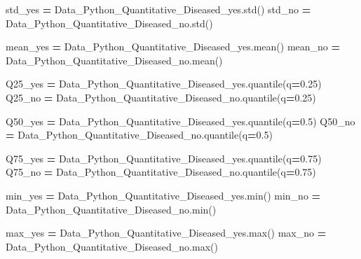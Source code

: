 \documentclass[
  11pt,
  a4paper,
]{article}
\newenvironment{Shaded}{\begin{snugshade}}{\end{snugshade}}
\newcommand{\BuiltInTok}[1]{#1}
\newcommand{\FloatTok}[1]{\textcolor[rgb]{0.00,0.00,0.81}{#1}}
\newcommand{\NormalTok}[1]{#1}
\newcommand{\OperatorTok}[1]{\textcolor[rgb]{0.81,0.36,0.00}{\textbf{#1}}}
\begin{document}
\begin{Shaded}
\begin{Highlighting}[]
\NormalTok{std\_yes }\OperatorTok{=}\NormalTok{ Data\_Python\_Quantitative\_Diseased\_yes.std()}
\NormalTok{std\_no }\OperatorTok{=}\NormalTok{ Data\_Python\_Quantitative\_Diseased\_no.std()}

\NormalTok{mean\_yes }\OperatorTok{=}\NormalTok{ Data\_Python\_Quantitative\_Diseased\_yes.mean()}
\NormalTok{mean\_no }\OperatorTok{=}\NormalTok{ Data\_Python\_Quantitative\_Diseased\_no.mean()}

\NormalTok{Q25\_yes }\OperatorTok{=}\NormalTok{ Data\_Python\_Quantitative\_Diseased\_yes.quantile(q}\OperatorTok{=}\FloatTok{0.25}\NormalTok{)}
\NormalTok{Q25\_no }\OperatorTok{=}\NormalTok{ Data\_Python\_Quantitative\_Diseased\_no.quantile(q}\OperatorTok{=}\FloatTok{0.25}\NormalTok{)}

\NormalTok{Q50\_yes }\OperatorTok{=}\NormalTok{ Data\_Python\_Quantitative\_Diseased\_yes.quantile(q}\OperatorTok{=}\FloatTok{0.5}\NormalTok{)}
\NormalTok{Q50\_no }\OperatorTok{=}\NormalTok{ Data\_Python\_Quantitative\_Diseased\_no.quantile(q}\OperatorTok{=}\FloatTok{0.5}\NormalTok{)}

\NormalTok{Q75\_yes }\OperatorTok{=}\NormalTok{ Data\_Python\_Quantitative\_Diseased\_yes.quantile(q}\OperatorTok{=}\FloatTok{0.75}\NormalTok{)}
\NormalTok{Q75\_no }\OperatorTok{=}\NormalTok{ Data\_Python\_Quantitative\_Diseased\_no.quantile(q}\OperatorTok{=}\FloatTok{0.75}\NormalTok{)}

\NormalTok{min\_yes }\OperatorTok{=}\NormalTok{ Data\_Python\_Quantitative\_Diseased\_yes.}\BuiltInTok{min}\NormalTok{()}
\NormalTok{min\_no }\OperatorTok{=}\NormalTok{ Data\_Python\_Quantitative\_Diseased\_no.}\BuiltInTok{min}\NormalTok{()}

\NormalTok{max\_yes }\OperatorTok{=}\NormalTok{ Data\_Python\_Quantitative\_Diseased\_yes.}\BuiltInTok{max}\NormalTok{()}
\NormalTok{max\_no }\OperatorTok{=}\NormalTok{ Data\_Python\_Quantitative\_Diseased\_no.}\BuiltInTok{max}\NormalTok{()}
\end{Highlighting}
\end{Shaded}
\end{document}
